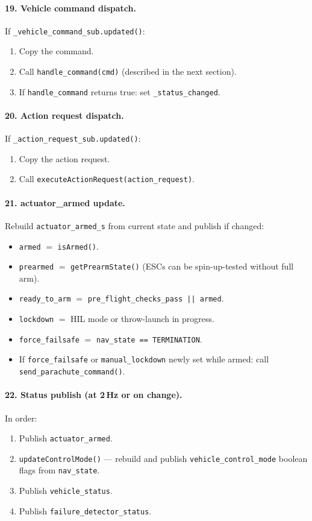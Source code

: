 \documentclass[12pt,a4paper]{article}
\begin{document}
\paragraph{19. Vehicle command dispatch.}
If \texttt{\_vehicle\_command\_sub.updated()}:
\begin{enumerate}
  \item Copy the command.
  \item Call \texttt{handle\_command(cmd)} (described in the next section).
  \item If \texttt{handle\_command} returns true: set \texttt{\_status\_changed}.
\end{enumerate}

\paragraph{20. Action request dispatch.}
If \texttt{\_action\_request\_sub.updated()}:
\begin{enumerate}
  \item Copy the action request.
  \item Call \texttt{executeActionRequest(action\_request)}.
\end{enumerate}

\paragraph{21. actuator\_armed update.}
Rebuild \texttt{actuator\_armed\_s} from current state and publish if changed:
\begin{itemize}
  \item \texttt{armed} $=$ \texttt{isArmed()}.
  \item \texttt{prearmed} $=$ \texttt{getPrearmState()} (ESCs can be
        spin-up-tested without full arm).
  \item \texttt{ready\_to\_arm} $=$ \texttt{pre\_flight\_checks\_pass || armed}.
  \item \texttt{lockdown} $=$ HIL mode or throw-launch in progress.
  \item \texttt{force\_failsafe} $=$ \texttt{nav\_state == TERMINATION}.
  \item If \texttt{force\_failsafe} or \texttt{manual\_lockdown} newly set while armed:
        call \texttt{send\_parachute\_command()}.
\end{itemize}

\paragraph{22. Status publish (at 2\,Hz or on change).}
In order:
\begin{enumerate}
  \item Publish \texttt{actuator\_armed}.
  \item \texttt{updateControlMode()} --- rebuild and publish
        \texttt{vehicle\_control\_mode} boolean flags from \texttt{nav\_state}.
  \item Publish \texttt{vehicle\_status}.
  \item Publish \texttt{failure\_detector\_status}.
\end{enumerate}
\end{document}
